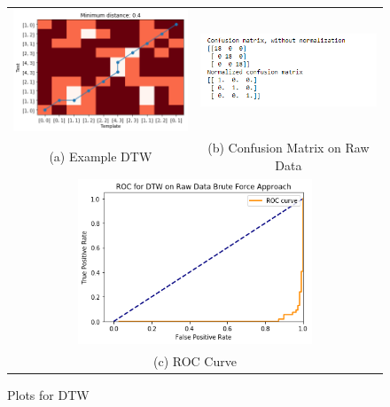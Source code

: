\begin{figure}[h!]
	\hspace*{1cm}\begin{tabular}{cc}
		\includegraphics[width=70mm]{DTW/dtw_try.png} & \includegraphics[width=70mm]{DTW/confusion_matrix_raw_data.png} \\
		(a) Example DTW & (b) Confusion Matrix on Raw Data\\[4pt]
		
		\multicolumn{2}{c}{\includegraphics[width=70mm]{DTW/roc_dtw.png} }\\
		\multicolumn{2}{c}{(c) ROC Curve}
		
	\end{tabular}\hspace*{1cm}
	\caption{Plots for DTW}
\end{figure}